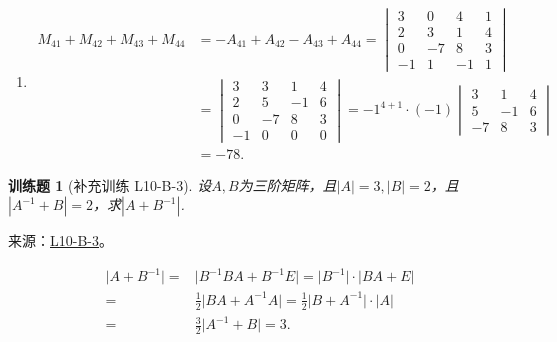 \documentclass[12pt,fontset=fandol]{ctexart}
\newtheorem{exercise}{训练题}[section]
\begin{document}
\begin{solve}
\begin{enumerate}
                \item \begin{align*}
                            M_{41}+M_{42}+M_{43}+M_{44}
                            & = -A_{41}+A_{42}-A_{43}+A_{44}
                            = \begin{vmatrix}
                                3  & 0  & 4  & 1 \\
                                2  & 3  & 1  & 4 \\
                                0  & -7 & 8  & 3 \\
                                -1 & 1  & -1 & 1
                            \end{vmatrix}                     \\
                            & = \begin{vmatrix}
                                    3  & 3  & 1  & 4 \\
                                    2  & 5  & -1 & 6 \\
                                    0  & -7 & 8  & 3 \\
                                    -1 & 0  & 0  & 0
                                \end{vmatrix}
                            = {-1}^{4+1} \cdot (-1) \begin{vmatrix}
                                                        3  & 1  & 4 \\
                                                        5  & -1 & 6 \\
                                                        -7 & 8  & 3
                                                    \end{vmatrix} \\
                            & = -78.
                        \end{align*}
            \end{enumerate}
\end{solve}

\begin{exercise}[补充训练 L10-B-3]\label{prob:L10-B-3}
设$A,B$为三阶矩阵，且$|A|=3,|B|=2$，且$|A^{-1}+B|=2$，求$|A+B^{-1}|$.
\end{exercise}
\noindent 来源：\href{https://github.com/yhwu-is/Linear-Algebra-Left-Undone/blob/new/%E8%AE%B2%E4%B9%89/%E4%B8%93%E9%A2%98/10%20%E8%A1%8C%E5%88%97%E5%BC%8F.tex}{L10-B-3}。
\begin{solve}
\begin{align*}
                \lvert A+B^{-1} \rvert ={} & \lvert B^{-1}BA+B^{-1}E \rvert = \lvert B^{-1} \rvert \cdot \lvert BA+E \rvert                  \\
                ={}                        & \frac{1}{2} \lvert BA+A^{-1}A \rvert = \frac{1}{2} \lvert B+A^{-1} \rvert \cdot \lvert A \rvert \\
                ={}                        & \frac{3}{2} \lvert A^{-1}+B \rvert = 3.
            \end{align*}
\end{solve}
\end{document}
